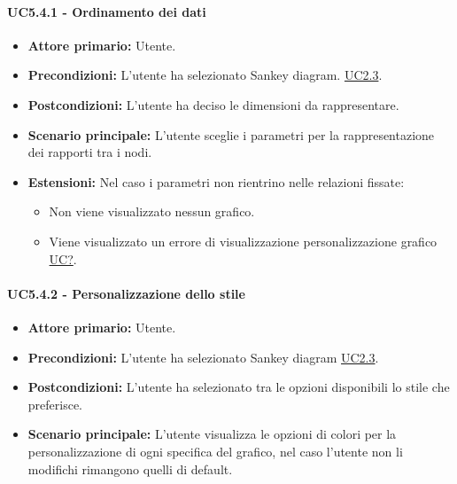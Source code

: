 \paragraph{UC5.4.1 - Ordinamento dei dati}
\label{sec:UC5.4.1}
    \begin{itemize}
        \item \textbf{Attore primario:} Utente.
        \item \textbf{Precondizioni:} L'utente ha selezionato Sankey diagram. \hyperref[sec:UC2.3]{UC2.3}.
	    \item \textbf{Postcondizioni:} L'utente ha deciso le dimensioni da rappresentare.
	    \item \textbf{Scenario principale:} L'utente sceglie i parametri per la rappresentazione dei rapporti tra i nodi.
	    \item \textbf{Estensioni:} Nel caso i parametri non rientrino nelle relazioni fissate:
              \begin{itemize}
                  \item Non viene visualizzato nessun grafico.
                  \item Viene visualizzato un errore di visualizzazione personalizzazione grafico \hyperref[sec:UC - Errore di personalizzazione]{UC?}.
              \end{itemize}
    \end{itemize}
\paragraph{UC5.4.2 - Personalizzazione dello stile}
\label{sec:UC5.4.2}
\begin{itemize}
    \item \textbf{Attore primario:} Utente.
    \item \textbf{Precondizioni:} L'utente ha selezionato Sankey diagram \hyperref[sec:UC2.3]{UC2.3}.
	\item \textbf{Postcondizioni:} L'utente ha selezionato tra le opzioni disponibili lo stile che preferisce.
	\item \textbf{Scenario principale:} L'utente visualizza le opzioni di colori per la personalizzazione di ogni specifica del grafico, nel caso l'utente non li modifichi rimangono quelli di default.
\end{itemize}

\newpage


